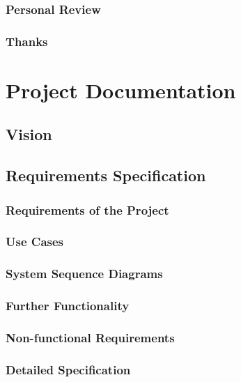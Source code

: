\documentclass[a4paper,parskip=full]{scrreprt}
\begin{document}
\section{Personal Review}
\section{Thanks}


\part{Project Documentation}
\chapter{Vision}

\chapter{Requirements Specification}
\section{Requirements of the Project}
\section{Use Cases}
\section{System Sequence Diagrams}
\section{Further Functionality}
\section{Non-functional Requirements}
\section{Detailed Specification}

\end{document}
